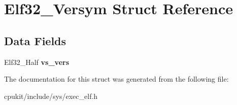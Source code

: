 \hypertarget{structElf32__Versym}{}\section{Elf32\+\_\+\+Versym Struct Reference}
\label{structElf32__Versym}
\subsection*{Data Fields}
\begin{DoxyCompactItemize}
\item 
\mbox{\label{structElf32__Versym_a423854a04ecf8aaf4c79bf86feeddc41}} 
Elf32\+\_\+\+Half {\bfseries vs\+\_\+vers}
\end{DoxyCompactItemize}


The documentation for this struct was generated from the following file\+:\begin{DoxyCompactItemize}
\item 
cpukit/include/sys/exec\+\_\+elf.\+h\end{DoxyCompactItemize}
